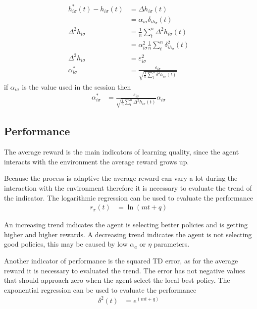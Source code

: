 \documentclass[]{article}
\begin{document}
\begin{align*}
	h^*_{i\sigma}(t) - h_{i\sigma}(t)&=	\Delta h_{i\sigma}(t)
	\\
	&=	\alpha_{i\sigma} \delta_{ih_\sigma}(t)
	\\
	\Delta^2h_{i\sigma}&=			\frac{1}{n} \sum_t^n \Delta^2 h_{i\sigma}(t)
	\\
	&=	\alpha^2_{i\sigma}\frac{1}{n}\sum_t^n  \delta^2_{ih_\sigma}(t)
	\\
	\Delta^2h_{i\sigma} &=	\varepsilon^2_{i\sigma}
	\\
	\alpha^*_{i\sigma}&=	\frac{\varepsilon_{i\sigma}}{\sqrt{\frac{1}{n} \sum_t^n \delta^2 h_{i\sigma}(t)}}
\end{align*}
if $ \alpha_{i\sigma} $ is the value used in the session then
\begin{align}
	\alpha^*_{i\sigma}&=	\frac{\varepsilon_{i\sigma}}{\sqrt{\frac{1}{n} \sum_t^n  \Delta^2 h_{i\sigma}(t)}} \alpha_{i\sigma}
\end{align}

\subsection{Performance}

The average reward is the main indicators of learning quality, since the agent interacts with the environment the average reward grows up.

Because the process is adaptive the average reward can vary a lot during the interaction with the environment therefore it is necessary to evaluate the trend of the indicator. The logarithmic regression can be used to evaluate the performance
\begin{align}
	r_\pi(t) & = \ln (mt + q)
\end{align}

An increasing trend indicates the agent is selecting better policies and is getting higher and higher rewards.
A decreasing trend indicates the agent is not selecting good policies, this may be caused by low $ \alpha_a $ or $ \eta $ parameters.

Another indicator of performance is the squared TD error, as for the average reward it is necessary to evaluated the trend.
The error has not negative values that should approach zero when the agent select the local best policy. The exponential regression can be used to evaluate the performance
\begin{align}
	\delta^2(t) & = e^{(mt + q)}
\end{align}
\end{document}
